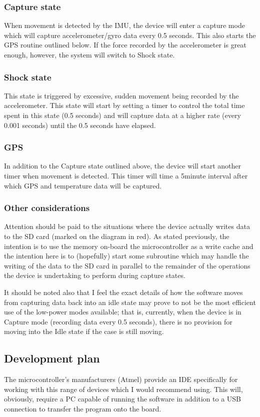 \documentclass[a4paper, twoside]{article}
\begin{document}
\subsubsection{Capture state}
When movement is detected by the IMU, the device will enter a capture mode which
will capture accelerometer/gyro data every 0.5 seconds. This also starts the GPS
routine outlined below. If the force recorded by the accelerometer is great
enough, however, the system will switch to Shock state.

\subsubsection{Shock state}
This state is triggered by excessive, sudden movement being recorded by the
accelerometer. This state will start by setting a timer to control the total
time spent in this state (0.5 seconds) and will capture data at a higher rate
(every 0.001 seconds) until the 0.5 seconds have elapsed.

\subsubsection{GPS}
In addition to the Capture state outlined above, the device will start another
timer when movement is detected. This timer will time a 5minute interval after
which GPS and temperature data will be captured.

\subsubsection{Other considerations}
Attention should be paid to the situations where the device actually writes data
to the SD card (marked on the diagram in red). As stated previously, the
intention is to use the memory on-board the microcontroller as a write cache and
the intention here is to (hopefully) start some subroutine which may handle the
writing of the data to the SD card in parallel to the remainder of the
operations the device is undertaking to perform during capture states.

It should be noted also that I feel the exact details of how the software moves
from capturing data back into an idle state may prove to not be the most
efficient use of the low-power modes available; that is, currently, when the
device is in Capture mode (recording data every 0.5 seconds), there is no
provision for moving into the Idle state if the case is still moving.

\subsection{Development plan}
The microcontroller's manufacturers (Atmel) provide an IDE specifically for
working with this range of devices which I would recommend using. This will,
obviously, require a PC capable of running the software in addition to a USB
connection to transfer the program onto the board.
\end{document}
